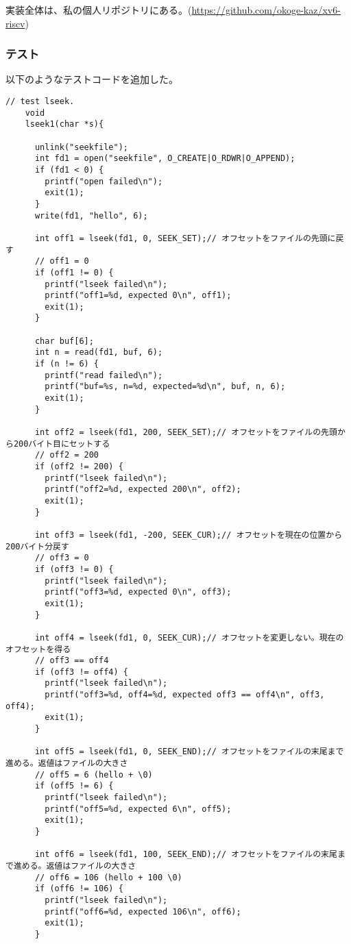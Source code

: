 \documentclass[platex,dvipdfmx, titlepage]{jlreq} %
\begin{document}
実装全体は、私の個人リポジトリにある。(\url{https://github.com/okoge-kaz/xv6-riscv})

\subsubsection*{テスト}

以下のようなテストコードを追加した。

\begin{lstlisting}[caption={user/usertests.c}]
    // test lseek.
    void
    lseek1(char *s){
    
      unlink("seekfile");
      int fd1 = open("seekfile", O_CREATE|O_RDWR|O_APPEND);
      if (fd1 < 0) {
        printf("open failed\n");
        exit(1);
      }
      write(fd1, "hello", 6);
    
      int off1 = lseek(fd1, 0, SEEK_SET);// オフセットをファイルの先頭に戻す
      // off1 = 0
      if (off1 != 0) {
        printf("lseek failed\n");
        printf("off1=%d, expected 0\n", off1);
        exit(1);
      }
    
      char buf[6];
      int n = read(fd1, buf, 6);
      if (n != 6) {
        printf("read failed\n");
        printf("buf=%s, n=%d, expected=%d\n", buf, n, 6);
        exit(1);
      }
    
      int off2 = lseek(fd1, 200, SEEK_SET);// オフセットをファイルの先頭から200バイト目にセットする
      // off2 = 200
      if (off2 != 200) {
        printf("lseek failed\n");
        printf("off2=%d, expected 200\n", off2);
        exit(1);
      }
    
      int off3 = lseek(fd1, -200, SEEK_CUR);// オフセットを現在の位置から200バイト分戻す
      // off3 = 0
      if (off3 != 0) {
        printf("lseek failed\n");
        printf("off3=%d, expected 0\n", off3);
        exit(1);
      }
    
      int off4 = lseek(fd1, 0, SEEK_CUR);// オフセットを変更しない。現在のオフセットを得る
      // off3 == off4
      if (off3 != off4) {
        printf("lseek failed\n");
        printf("off3=%d, off4=%d, expected off3 == off4\n", off3, off4);
        exit(1);
      }
    
      int off5 = lseek(fd1, 0, SEEK_END);// オフセットをファイルの末尾まで進める。返値はファイルの大きさ
      // off5 = 6 (hello + \0)
      if (off5 != 6) {
        printf("lseek failed\n");
        printf("off5=%d, expected 6\n", off5);
        exit(1);
      }
    
      int off6 = lseek(fd1, 100, SEEK_END);// オフセットをファイルの末尾まで進める。返値はファイルの大きさ
      // off6 = 106 (hello + 100 \0)
      if (off6 != 106) {
        printf("lseek failed\n");
        printf("off6=%d, expected 106\n", off6);
        exit(1);
      }
    

\end{lstlisting}
\end{document}
